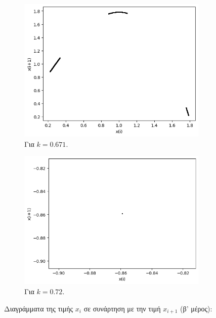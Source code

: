\begin{figure}
\begin{subfigure}[b]{0.4\textwidth}
		\includegraphics[width=\textwidth]{LateX images/graphs q09/g11}
		\caption{Για $k=0.671$.}
		\label{f:k57}
	\end{subfigure}
	\hfill
	\begin{subfigure}[b]{0.4\textwidth}
		\centering
		\includegraphics[width=\textwidth]{LateX images/graphs q09/g12}
		\caption{Για $k=0.72$.}
		\label{f:k58}
	\end{subfigure}
	\hfill
	\caption{Διαγράμματα της τιμής \(x_i\) σε συνάρτηση με την τιμή \(x_{i+1}\) (β' μέρος):}
\end{figure}

\clearpage

